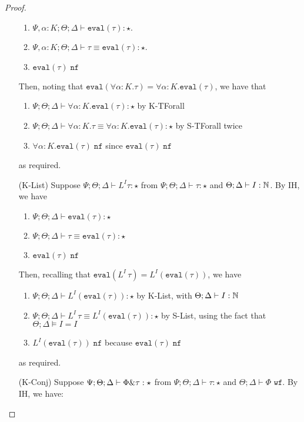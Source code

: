 \begin{proof}
\begin{enumerate}
\begin{enumerate}[1.]
   \item ${\Psi, \alpha : K ; \Theta ; \Delta \vdash \texttt{eval}(\tau) : \star}$.
   \item ${\Psi, \alpha : K ; \Theta ; \Delta \vdash \tau \equiv \texttt{eval}(\tau) : \star}$.
   \item $\texttt{eval}(\tau) \; \texttt{nf}$
  \end{enumerate}
  Then, noting that $\texttt{eval}(\forall \alpha : K. \tau) = \forall \alpha : K.\texttt{eval}(\tau)$, we have that
  \begin{enumerate}[1.]
   \item ${\Psi ; \Theta ; \Delta \vdash \forall \alpha : K. \texttt{eval}(\tau) : \star}$ by K-TForall
   \item ${\Psi ; \Theta ; \Delta \vdash \forall \alpha : K.\tau \equiv \forall \alpha : K. \texttt{eval}(\tau) : \star}$ by S-TForall twice
   \item $\forall \alpha : K. \texttt{eval}(\tau) \; \texttt{nf}$ since $\texttt{eval}(\tau) \; \texttt{nf}$
  \end{enumerate}
  as required.
  \item[(K-List)] Suppose ${\Psi ; \Theta ; \Delta \vdash L^I \tau : \star}$ from $\Psi ; \Theta ; \Delta \vdash \tau : \star$ and $\Theta ; \Delta \vdash I : \mathbb{N}$.
  By IH, we have
  \begin{enumerate}[1.]
    \item $\Psi ; \Theta ; \Delta \vdash \texttt{eval}(\tau) : \star$
    \item $\Psi ; \Theta ; \Delta \vdash \tau \equiv \texttt{eval}(\tau) : \star$
    \item $\texttt{eval}(\tau) \; \texttt{nf}$
  \end{enumerate}
  Then, recalling that $\texttt{eval}\left(L^I \,\tau\right) = L^I\left(\texttt{eval}(\tau)\right)$, we have
  \begin{enumerate}[1.]
    \item $\Psi ; \Theta ; \Delta \vdash L^I\left(\texttt{eval}(\tau)\right) : \star$ by K-List, with $\Theta ; \Delta \vdash I : \mathbb{N}$
    \item $\Psi ; \Theta ; \Delta \vdash L^I \, \tau \equiv L^I\left(\texttt{eval}(\tau)\right) : \star$ by S-List, using the fact that $\Theta ; \Delta \vDash I = I$
    \item $L^I\left(\texttt{eval}(\tau)\right) \; \texttt{nf}$ because $\texttt{eval}(\tau) \; \texttt{nf}$
  \end{enumerate}
  as required.
  \item[(K-Conj)] Suppose ${\Psi ; \Theta ; \Delta \vdash \Phi \& \tau : \star}$ from $\Psi ; \Theta ; \Delta \vdash \tau : \star$ and $\Theta ; \Delta \vdash \Phi \texttt{ wf}$. By  IH, we have:

\end{enumerate}
\end{proof}
